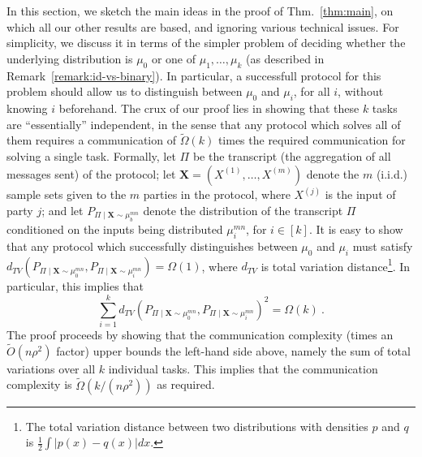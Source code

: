 \documentclass[final, 12pt]{colt2018}
\newcommand{\thmref}[1]{Thm.~\ref{#1}}
\begin{document}
In this section, we sketch the main ideas in the proof of \thmref{thm:main}, on which all our other results are based, and ignoring various technical issues. For simplicity, we discuss it in terms of the simpler problem of deciding whether the underlying distribution is $\mu_0$ or one of $\mu_1, \dots, \mu_k$ (as described in Remark~\ref{remark:id-vs-binary}). In particular, a successfull protocol for this problem should allow us to distinguish between $\mu_0$ and $\mu_i$, for all $i$, without knowing $i$ beforehand. The crux of our proof lies in showing that these $k$ tasks are ``essentially'' independent, in the sense that any protocol which solves all of them requires a communication of $\tilde\Omega(k)$ times the required communication for solving a single task. Formally, let $\Pi$ be the transcript (the aggregation of all messages sent) of the protocol; let $\mathbf{X} = \left(X^{(1)}, \dots, X^{(m)}\right)$ denote the $m$ (i.i.d.) sample sets given to the $m$ parties in the protocol, where $X^{(j)}$ is the input of party $j$; and let 
$P_{\Pi \mid \mathbf{X} \sim \mu_b^{mn}}$ denote the distribution of the transcript $\Pi$ conditioned on the inputs being distributed $\mu_i^{mn}$, for $i\in [k]$. It is easy to show that any protocol which successfully distinguishes between $\mu_0$ and $\mu_i$ must satisfy $d_{TV}\left( P_{\Pi \mid \mathbf{X} \sim \mu_0^{mn}}, P_{\Pi \mid \mathbf{X} \sim \mu_i^{mn}} \right) = \Omega(1)$, where $d_{TV}$ is total variation distance\footnote{The total variation distance between  two distributions with densities $p$ and $q$ is $\frac{1}{2}\int\left| p(x) - q(x)\right| dx$.}. In particular, this implies that 
\begin{equation} \label{eq:decomp}
\sum_{i=1}^k d_{TV}\left( P_{\Pi \mid \mathbf{X} \sim \mu_0^{mn}}, P_{\Pi \mid \mathbf{X} \sim \mu_i^{mn}} \right)^2
= \Omega(k)~.
\end{equation}
The proof proceeds by showing that the communication complexity (times an $\tilde{O}(n\rho^2)$ factor) upper bounds the left-hand side above, namely the sum of total variations over all $k$ individual tasks. This implies that the communication complexity is $\tilde{\Omega}(k/(n\rho^2))$ as required.
\end{document}
